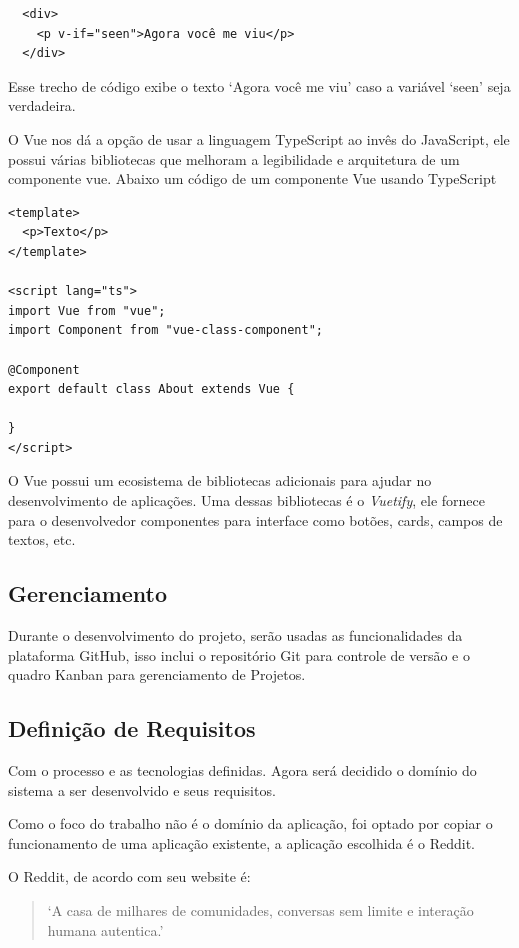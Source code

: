 \documentclass[12pt]{article}
\begin{document}
\begin{verbatim}
  <div>
    <p v-if="seen">Agora você me viu</p>
  </div>
\end{verbatim}

Esse trecho de código exibe o texto `Agora você me viu' caso a variável `seen' seja verdadeira.

O Vue nos dá a opção de usar a linguagem TypeScript ao invês do JavaScript, ele possui
várias bibliotecas que melhoram a legibilidade e arquitetura de um componente vue.
Abaixo um código de um componente Vue usando TypeScript

\begin{verbatim}
<template>
  <p>Texto</p>
</template>

<script lang="ts">
import Vue from "vue";
import Component from "vue-class-component";

@Component
export default class About extends Vue {

}
</script>
\end{verbatim}

O Vue possui um ecosistema de bibliotecas adicionais para ajudar no desenvolvimento de aplicações.
Uma dessas bibliotecas é o \textit{Vuetify}, ele fornece para o desenvolvedor componentes para interface
como botões, cards, campos de textos, etc.

\subsection{Gerenciamento}

Durante o desenvolvimento do projeto, serão usadas as funcionalidades da plataforma GitHub, isso inclui
o repositório Git para controle de versão e o quadro Kanban para gerenciamento de Projetos.

\subsection{Definição de Requisitos}

Com o processo e as tecnologias definidas. Agora será decidido o domínio do sistema a ser desenvolvido
e seus requisitos.

Como o foco do trabalho não é o domínio da aplicação, foi optado por copiar o funcionamento de uma aplicação
existente, a aplicação escolhida é o Reddit.

O Reddit, de acordo com seu website é:

\begin{quote}
  `A casa de milhares de comunidades, conversas sem
  limite e interação humana autentica.'
\end{quote}
\end{document}
